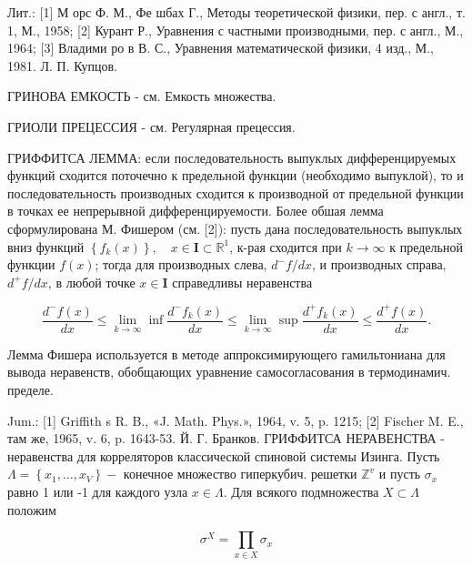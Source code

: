 \documentclass[10pt]{article}
\begin{document}
Лит.: [1] М орс Ф. М., Фе шбах Г., Методы теоретической физики, пер. с англ., т. 1, М., 1958; [2] Курант Р., Уравнения с частными производными, пер. с англ., М., 1964; [3] Владими ро в В. С., Уравнения математической физики, 4 изд., М., 1981. Л. П. Купцов.



ГРИНОВА ЕМКОСТЬ - см. Емкость множества.



ГРИОЛИ ПРЕЦЕССИЯ - см. Регулярная прецессия.



ГРИФФИТСА ЛЕММА: если последовательность выпуклых дифференцируемых функций сходится поточечно к предельной функции (необходимо выпуклой), то и последовательность производных сходится к производной от предельной функции в точках ее непрерывной дифференцируемости. Более обшая лемма сформулирована М. Фишером (см. [2]): пусть дана последовательность выпуклых вниз функций $\left\{f_{k}(x)\right\}, \quad x \in \mathbf{I} \subset \mathbb{R}^{1}$, к-рая сходится при $k \rightarrow \infty$ к предельной функции $f(x)$; тогда для производных слева, $d^{-} f / d x$, и производных справа, $d^{+} f / d x$, в любой точке $x \in \mathbf{I}$ справедливы неравенства



\[

\frac{d^{-} f(x)}{d x} \leqslant \lim _{k \rightarrow \infty} \inf \frac{d^{-} f_{k}(x)}{d x} \leqslant \lim _{k \rightarrow \infty} \sup \frac{d^{+} f_{k}(x)}{d x} \leqslant \frac{d^{+} f(x)}{d x} .

\]



Лемма Фишера используется в методе аппроксимирующего гамильтониана для вывода неравенств, обобщающих уравнение самосогласования в термодинамич. пределе.



Jum.: [1] Griffith s R. B., «J. Math. Phys.», 1964, v. 5, p. 1215; [2] Fischer M. E., там же, 1965, v. 6, p. 1643-53. Й. Г. Бранков. ГРИФФИТСА НЕРАВЕНСТВА - неравенства для корреляторов классической спиновой системы Изинга. Пусть $\Lambda=\left\{x_{1}, \ldots, x_{V}\right\}-$ конечное множество гиперкубич. решетки $\mathbb{Z}^{v}$ и пусть $\sigma_{x}$ равно 1 или -1 для каждого узла $x \in \Lambda$. Для всякого подмножества $X \subset \Lambda$ положим



\[

\sigma^{X}=\prod_{x \in X} \sigma_{x}

\]
\end{document}
